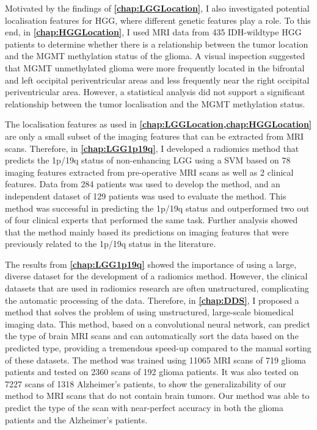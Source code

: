 Motivated by the findings of \textbf{\cref{chap:LGGLocation}}, I also investigated potential localisation features for \gls{HGG}, where different genetic features play a role.
To this end, in \textbf{\cref{chap:HGGLocation}}, I used \gls{MRI} data from 435 \gls{IDH}-wildtype \gls{HGG} patients to determine whether there is a relationship between the \gls{tumor} location and the \gls{MGMT} methylation status of the glioma.
A visual inspection suggested that \gls{MGMT} unmethylated glioma were more frequently located in the bifrontal and left occipital periventricular areas and less frequently near the right occipital periventricular area.
However, a statistical analysis did not support a significant relationship between the \gls{tumor} localisation and the \gls{MGMT} methylation status.

The localisation features as used in \textbf{\cref{chap:LGGLocation,chap:HGGLocation}} are only a small subset of the imaging features that can be extracted from \gls{MRI} scans.
Therefore, in \textbf{\cref{chap:LGG1p19q}}, I developed a radiomics method that predicts the 1p/19q status of non-enhancing \gls{LGG} using a \gls{SVM} based on 78 imaging features extracted from pre-operative \gls{MRI} scans as well as 2 clinical features.
Data from 284 patients was used to develop the method, and an independent dataset of 129 patients was used to evaluate the method.
This method was successful in predicting the 1p/19q status and outperformed two out of four clinical experts that performed the same task.
Further analysis showed that the method mainly based its predictions on imaging features that were previously related to the 1p/19q status in the literature.

The results from \textbf{\cref{chap:LGG1p19q}} showed the importance of using a large, diverse dataset for the development of a radiomics method.
However, the clinical datasets that are used in radiomics research are often unstructured, complicating the automatic processing of the data.
Therefore, in \textbf{\cref{chap:DDS}}, I proposed a method that solves the problem of using unstructured, large-scale biomedical imaging data.
This method, based on a convolutional neural network, can  predict the type of brain \gls{MRI} scans and can automatically sort the data based on the predicted type, providing a tremendous speed-up compared to the manual sorting of these datasets.
The method was trained using \num{11065} \gls{MRI} scans of 719 glioma patients and tested on \num{2360} scans of 192 glioma patients.
It was also tested on \num{7227} scans of \num{1318} Alzheimer's patients, to show the generalizability of our method to \gls{MRI} scans that do not contain brain \glspl{tumor}.
Our method was able to predict the type of the scan with near-perfect accuracy in both the glioma patients and the Alzheimer's patients.

